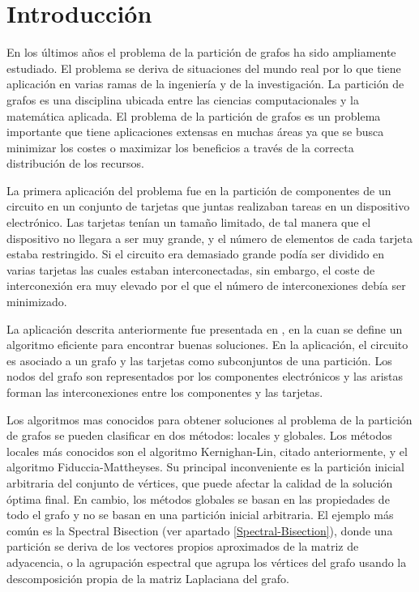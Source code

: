 \section{Introducción}
En los últimos años el problema de la partición de grafos ha sido ampliamente estudiado. El problema se deriva de situaciones del mundo real por lo que tiene aplicación en varias ramas de la ingeniería y de la investigación. La partición de grafos es una disciplina ubicada entre las ciencias computacionales y la matemática aplicada. El problema de la partición de grafos es un problema importante que tiene aplicaciones extensas en muchas áreas ya que se busca minimizar los costes o maximizar los beneficios a través de la correcta distribución de los recursos. 

La primera aplicación del problema fue en la partición de componentes de un circuito en un conjunto de tarjetas que juntas realizaban tareas en un dispositivo electrónico. Las tarjetas tenían un tamaño limitado, de tal manera que el dispositivo no llegara a ser muy grande, y el número de elementos de cada tarjeta estaba restringido. Si el circuito era demasiado grande podía ser dividido en varias tarjetas las cuales estaban interconectadas, sin embargo, el coste de interconexión era muy elevado por el que el número de interconexiones debía ser minimizado.

La aplicación descrita anteriormente fue presentada en \cite{KernighanLin}, en la cuan se define un algoritmo eficiente para encontrar buenas soluciones. En la aplicación, el circuito es asociado a un grafo y las tarjetas como subconjuntos de una partición. Los nodos del grafo son representados por los componentes electrónicos y las aristas forman las interconexiones entre los componentes y las tarjetas.

Los algoritmos mas conocidos para obtener soluciones al problema de la partición de grafos se pueden clasificar en dos métodos: locales y globales. Los métodos locales más conocidos son el algoritmo Kernighan-Lin\cite{KernighanLin}, citado anteriormente, y el algoritmo Fiduccia-Mattheyses\cite{FiducciaMattheyses}. Su principal inconveniente es la partición inicial arbitraria del conjunto de vértices, que puede afectar la calidad de la solución óptima final. En cambio, los métodos globales se basan en las propiedades de todo el grafo y no se basan en una partición inicial arbitraria. El ejemplo más común es la Spectral Bisection (ver apartado \ref{Spectral-Bisection}), donde una partición se deriva de los vectores propios aproximados de la matriz de adyacencia, o la agrupación espectral que agrupa los vértices del grafo usando la descomposición propia de la matriz Laplaciana del grafo.

